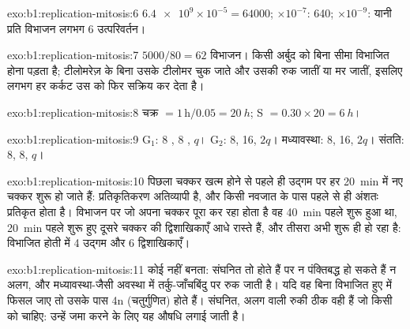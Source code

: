 \begin{solution}{exo:b1:replication-mitosis:6}
$\num{6.4e9}\times 10^{-5} = \num{64000}$; $\times 10^{-7}$: 640;
$\times 10^{-9}$: यानी प्रति विभाजन लगभग 6 उत्परिवर्तन।
\end{solution}

\begin{solution}{exo:b1:replication-mitosis:7}
$5000/80 = 62$ विभाजन। किसी अर्बुद को बिना सीमा विभाजित होना पड़ता है;
टीलोमरेज़ के बिना उसके टीलोमर चुक जाते और उसकी  रुक जातीं या मर
जातीं, इसलिए लगभग हर कर्कट उस  को फिर सक्रिय कर देता है।
\end{solution}

\begin{solution}{exo:b1:replication-mitosis:8}
चक्र $= 1\,\mathrm{h}/0.05 = \qty{20}{h}$; S $= 0.30\times 20 =
\qty{6}{h}$।
\end{solution}

\begin{solution}{exo:b1:replication-mitosis:9}
G$_1$: 8 , 8 , $q$। G$_2$: 8, 16, $2q$। मध्यावस्था:
8, 16, $2q$। संतति: 8, 8, $q$।
\end{solution}

\begin{solution}{exo:b1:replication-mitosis:10}
पिछला चक्कर खत्म होने से पहले ही उद्गम पर हर \qty{20}{min} में नए चक्कर
शुरू हो जाते हैं: प्रतिकृतिकरण अतिव्यापी है, और किसी नवजात  के पास
पहले से ही अंशतः प्रतिकृत  होता है। विभाजन पर जो  अपना चक्कर
पूरा कर रहा होता है वह \qty{40}{min} पहले शुरू हुआ था, \qty{20}{min}
पहले शुरू हुए दूसरे चक्कर की द्विशाखिकाएँ आधे रास्ते हैं, और तीसरा अभी
शुरू ही हो रहा है: विभाजित होती  में 4 उद्गम और 6 द्विशाखिकाएँ।
\end{solution}

\begin{solution}{exo:b1:replication-mitosis:11}
कोई  नहीं बनता:  संघनित तो होते हैं पर न पंक्तिबद्ध हो सकते
हैं न अलग, और  मध्यावस्था-जैसी अवस्था में तर्कु-जाँचबिंदु पर रुक
जाती है। यदि वह बिना विभाजित हुए  में फिसल जाए तो उसके पास
4n  (चतुर्गुणित) होते हैं। संघनित, अलग  वाली रुकी
 ठीक वही हैं जो किसी  को चाहिए: उन्हें जमा करने के
लिए यह औषधि लगाई जाती है।
\end{solution}

